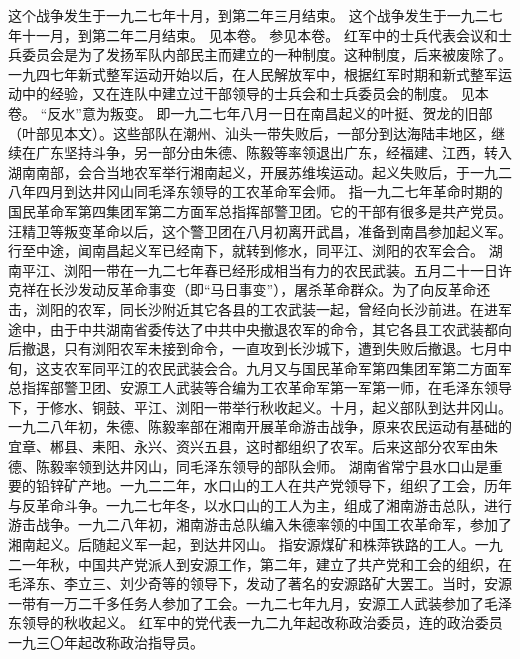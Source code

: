 \begin{maonote}
这个战争发生于一九二七年十月，到第二年三月结束。
这个战争发生于一九二七年十一月，到第二年二月结束。
见本卷。
参见本卷。
红军中的士兵代表会议和士兵委员会是为了发扬军队内部民主而建立的一种制度。这种制度，后来被废除了。一九四七年新式整军运动开始以后，在人民解放军中，根据红军时期和新式整军运动中的经验，又在连队中建立过干部领导的士兵会和士兵委员会的制度。
见本卷。
“反水”意为叛变。
即一九二七年八月一日在南昌起义的叶挺、贺龙的旧部（叶部见本文）。这些部队在潮州、汕头一带失败后，一部分到达海陆丰地区，继续在广东坚持斗争，另一部分由朱德、陈毅等率领退出广东，经福建、江西，转入湖南南部，会合当地农军举行湘南起义，开展苏维埃运动。起义失败后，于一九二八年四月到达井冈山同毛泽东领导的工农革命军会师。
指一九二七年革命时期的国民革命军第四集团军第二方面军总指挥部警卫团。它的干部有很多是共产党员。汪精卫等叛变革命以后，这个警卫团在八月初离开武昌，准备到南昌参加起义军。行至中途，闻南昌起义军已经南下，就转到修水，同平江、浏阳的农军会合。
湖南平江、浏阳一带在一九二七年春已经形成相当有力的农民武装。五月二十一日许克祥在长沙发动反革命事变（即“马日事变”），屠杀革命群众。为了向反革命还击，浏阳的农军，同长沙附近其它各县的工农武装一起，曾经向长沙前进。在进军途中，由于中共湖南省委传达了中共中央撤退农军的命令，其它各县工农武装都向后撤退，只有浏阳农军未接到命令，一直攻到长沙城下，遭到失败后撤退。七月中旬，这支农军同平江的农民武装会合。九月又与国民革命军第四集团军第二方面军总指挥部警卫团、安源工人武装等合编为工农革命军第一军第一师，在毛泽东领导下，于修水、铜鼓、平江、浏阳一带举行秋收起义。十月，起义部队到达井冈山。
一九二八年初，朱德、陈毅率部在湘南开展革命游击战争，原来农民运动有基础的宜章、郴县、耒阳、永兴、资兴五县，这时都组织了农军。后来这部分农军由朱德、陈毅率领到达井冈山，同毛泽东领导的部队会师。
湖南省常宁县水口山是重要的铅锌矿产地。一九二二年，水口山的工人在共产党领导下，组织了工会，历年与反革命斗争。一九二七年冬，以水口山的工人为主，组成了湘南游击总队，进行游击战争。一九二八年初，湘南游击总队编入朱德率领的中国工农革命军，参加了湘南起义。后随起义军一起，到达井冈山。
指安源煤矿和株萍铁路的工人。一九二一年秋，中国共产党派人到安源工作，第二年，建立了共产党和工会的组织，在毛泽东、李立三、刘少奇等的领导下，发动了著名的安源路矿大罢工。当时，安源一带有一万二千多任务人参加了工会。一九二七年九月，安源工人武装参加了毛泽东领导的秋收起义。
红军中的党代表一九二九年起改称政治委员，连的政治委员一九三〇年起改称政治指导员。

\end{maonote}
